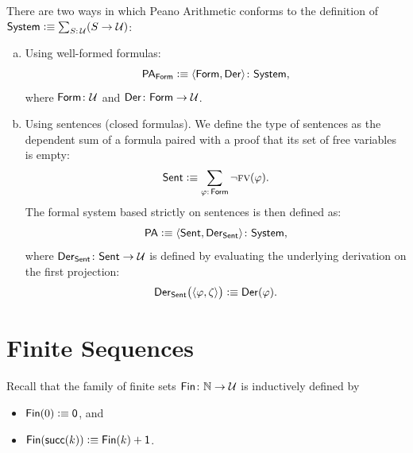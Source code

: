 \begin{defn}
    There are two ways in which Peano Arithmetic conforms to the definition of $\fun{System}\defeq\sum_{S\colon\univ}(S\to\univ)$:
    \begin{enumerate}[a),font=\upshape]
        \item Using well-formed formulas:
        \[
            \fun{PA}_{\fun{Form}}\defeq
                \dep{
                    \fun{Form},\fun{Der}
                }
                \colon\fun{System},
        \]
        where $\fun{Form}\colon\univ$ and $\fun{Der}\colon\fun{Form}\to\univ$.
        
        \item Using sentences (closed formulas). We define the type of sentences as the dependent sum of a formula paired with a proof that its set of free variables is empty:
        \[
            \fun{Sent}\defeq\sum_{\varphi\colon\fun{Form}}
                \neg\FV(\varphi).
        \]
        The formal system based strictly on sentences is then defined as:
        \[
            \fun{PA}\defeq
                \dep{
                    \fun{Sent},
                    \fun{Der}_{\fun{Sent}}
                }
                \colon\fun{System},
        \]
        where $\fun{Der}_{\fun{Sent}}\colon\fun{Sent}\to\univ$ is defined by evaluating the underlying derivation on the first projection:
        \[
            \mathsf{Der}_{\mathsf{Sent}}
                \bigl(
                    \langle\varphi,\zeta\rangle
                \bigr)
                \mathrel{\vcentcolon}\equiv\mathsf{Der}(\varphi).
        \]
    \end{enumerate}
\end{defn}


\section{Finite Sequences}
 Recall that the family of finite sets $\fun{Fin}\colon\N\to\univ$ is inductively defined by
    \begin{itemize}
        \item $\mathsf{Fin}(0)\mathrel{\vcentcolon}\equiv\mathsf{0}$, and
        \item $\mathsf{Fin}(\mathsf{succ}(k))\mathrel{\vcentcolon}\equiv\mathsf{Fin}(k)+\mathsf{1}$.
    \end{itemize}

